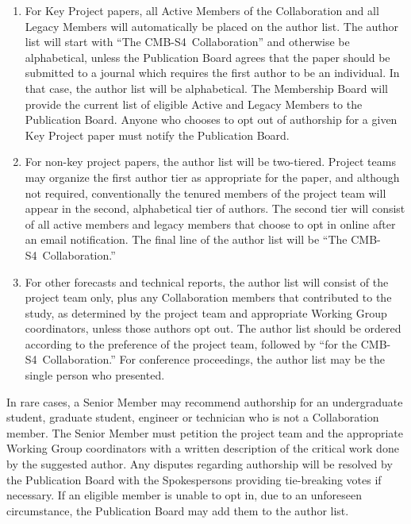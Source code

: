 \documentclass[12pt]{article}
\newcommand\collabname{CMB-S4}
\begin{document}
\begin{enumerate}
\item For Key Project papers, all Active Members of the Collaboration and all Legacy Members will automatically be placed on the author list.  The author list will start with ``The \collabname\ Collaboration'' and otherwise be alphabetical, unless the Publication Board agrees that the paper should be submitted to a journal which requires the first author to be an individual.  In that case, the author list will be alphabetical.
  The Membership Board will provide the current list of eligible Active and Legacy Members to the Publication Board.
  {\color{\markcolor} Anyone who chooses to opt out of authorship for a given Key Project paper must  notify the Publication Board.}
\item For non-key project papers, the author list will be two-tiered.
  Project teams may organize the first author tier as appropriate for the paper, and although not required, conventionally the tenured members of the project team will appear in the second, alphabetical tier of authors.
  The second tier will consist of all active members and legacy members that choose to opt in online after an email notification.  The final line of the author list will be ``The \collabname\ Collaboration.''
  \item For other forecasts and technical reports, the author list will consist of the project team only, plus any Collaboration members that contributed to the study, as determined by the project team and appropriate Working Group coordinators, unless those authors opt out.  The author list should be ordered according to the preference of the project team, followed by ``for the \collabname\ Collaboration.''  For conference proceedings, the author list may be the single person who presented.
\end{enumerate}

In rare cases, a Senior Member may recommend authorship for an undergraduate student, graduate student, engineer or technician who is not a Collaboration member.  The Senior Member must petition the project team and the appropriate Working Group coordinators with a written description of the critical work done by the suggested author. 
Any disputes regarding authorship will be resolved by the Publication Board with the Spokespersons providing  tie-breaking votes if necessary.  If an eligible member is unable to opt in, due to an unforeseen circumstance, the Publication Board may add them to the author list.
\end{document}
